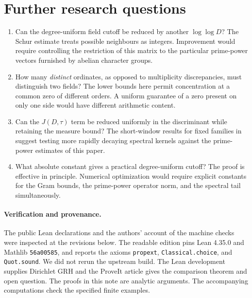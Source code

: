 \documentclass[11pt]{article}
\begin{document}
\section{Further research questions}
\begin{enumerate}
\item Can the degree-uniform field cutoff be reduced by another
$\log\log D$? The Schur estimate treats possible neighbours as integers.
Improvement would require controlling the restriction of this matrix to the
particular prime-power vectors furnished by abelian character groups.
\item How many \emph{distinct} ordinates, as opposed to multiplicity
discrepancies, must distinguish two fields? The lower bounds here permit
concentration at a common zero of different orders. A uniform guarantee
of a zero present on only one side would have different arithmetic content.
\item Can the $J(D,\tau)$ term be reduced uniformly in the discriminant
while retaining the measure bound? The short-window results for fixed
families in \cite{article} suggest testing more rapidly decaying
spectral kernels against the prime-power estimates of this paper.
\item What absolute constant gives a practical degree-uniform cutoff?
The proof is effective in principle. Numerical optimization would require
explicit constants for the Gram bounds, the prime-power operator norm,
and the spectral tail simultaneously.
\end{enumerate}

\paragraph{Verification and provenance.}
The public Lean declarations and the authors' account of the machine checks
were inspected at the revisions below. The readable edition pins Lean
4.35.0 and Mathlib \texttt{56a00585}, and reports the axioms
\texttt{propext}, \texttt{Classical.choice}, and \texttt{Quot.sound}.
We did not rerun the upstream build. The Lean development supplies Dirichlet GRH and the ProveIt article gives
the comparison theorem and open question. The proofs in this note are
analytic arguments. The accompanying computations check the specified
finite examples.
\end{document}
